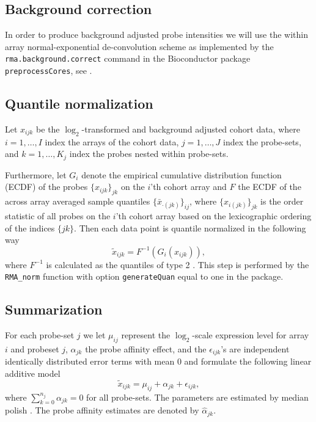 \subsection{Background correction}
In order to produce background adjusted probe intensities we will use the within array normal-exponential de-convolution scheme as implemented by the \texttt{rma.background.correct} command in the Bioconductor package \texttt{preprocessCores}, see
\citep{Irizarry2003b,Bolstad2004}.


\subsection{Quantile normalization}
Let $x_{ijk}$ be the $\log_2$-transformed and background adjusted cohort data, where $i = 1,\dots,I$ index the arrays of the cohort data, $j=1,\dots,J$  index the probe-sets, and $k=1,\dots,K_j$ index the probes nested within probe-sets.

Furthermore, let $G_i$ denote the empirical cumulative distribution function (ECDF) of the probes $\{x_{ijk}\}_{jk}$ on the $i$'th cohort array and $F$ the ECDF of the across array averaged sample quantiles $\{\bar{x}_{\cdot (jk)}\}_{ij}$, where $\{x_{i(jk)}\}_{jk}$ is the order statistic of all probes on the $i$'th cohort array based on the lexicographic ordering of the indices $\{jk\}$. Then each data point is quantile normalized in the following way
\begin{equation*}
     \tilde{x}_{ijk} = F^{-1}(G_i(x_{ijk})),
\end{equation*}
where $F^{-1}$ is calculated as the quantiles of type 2 \citep{Hyndman1996}.
This step is performed by the \texttt{RMA\_norm} function with option \texttt{generateQuan} equal to one in the  package.

\subsection{Summarization}

For each probe-set $j$ we let $\mu_{ij}$ represent the $\log_2$-scale expression level for array $i$ and probeset $j$, $\alpha_{jk}$ the probe affinity effect, and the $\epsilon_{ijk}$'s are independent identically distributed  error terms with mean 0 and formulate the following linear additive model
\begin{equation*}
   \tilde{x}_{ijk} = \mu_{ij} + \alpha_{jk}+ \epsilon_{ijk},
\end{equation*}
where $\sum_{k=0}^{n_j} \alpha_{jk} = 0$ for all probe-sets. The parameters are estimated by median polish \citep{Holder2001}. The probe affinity estimates are denoted by $\hat{\alpha}_{jk}$.

